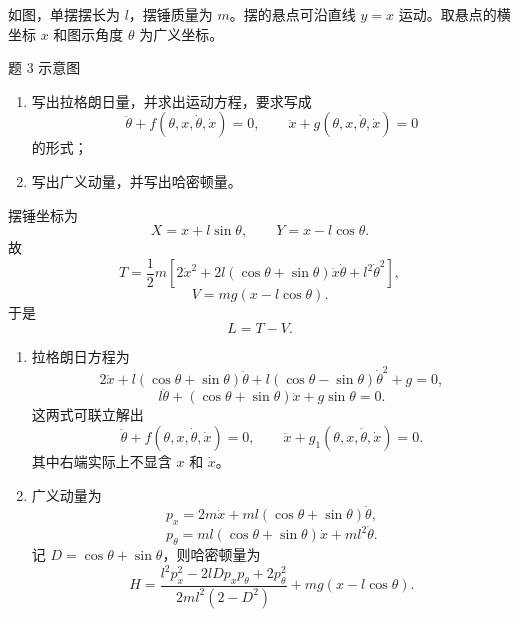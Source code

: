 \begin{question}[悬点受约束的单摆]
如图，单摆摆长为 $l$，摆锤质量为 $m$。摆的悬点可沿直线 $y=x$ 运动。取悬点的横坐标 $x$ 和图示角度 $\theta$ 为广义坐标。

\begin{center}

{\small 题 3 示意图}
\end{center}

\begin{enumerate}
  \item 写出拉格朗日量，并求出运动方程，要求写成
  \[
    \ddot\theta+f(\theta,x,\dot\theta,\dot x)=0,
    \qquad
    \ddot x+g(\theta,x,\dot\theta,\dot x)=0
  \]
  的形式；
  \item 写出广义动量，并写出哈密顿量。
\end{enumerate}

\begin{solution}
摆锤坐标为
\[
  X=x+l\sin\theta,
  \qquad
  Y=x-l\cos\theta .
\]
故
\[
  T=\frac12m\left[2\dot x^2+2l(\cos\theta+\sin\theta)\dot x\dot\theta
  +l^2\dot\theta^2\right],
\]
\[
  V=mg(x-l\cos\theta).
\]
于是
\[
  L=T-V.
\]
\begin{enumerate}
  \item 拉格朗日方程为
  \[
    2\ddot x+l(\cos\theta+\sin\theta)\ddot\theta
    +l(\cos\theta-\sin\theta)\dot\theta^2+g=0,
  \]
  \[
    l\ddot\theta+(\cos\theta+\sin\theta)\ddot x+g\sin\theta=0.
  \]
  这两式可联立解出
  \[
    \ddot\theta+f(\theta,x,\dot\theta,\dot x)=0,
    \qquad
    \ddot x+g_1(\theta,x,\dot\theta,\dot x)=0.
  \]
  其中右端实际上不显含 $x$ 和 $\dot x$。
  \item 广义动量为
  \[
    p_x=2m\dot x+ml(\cos\theta+\sin\theta)\dot\theta,
  \]
  \[
    p_\theta=ml(\cos\theta+\sin\theta)\dot x+ml^2\dot\theta .
  \]
  记 $D=\cos\theta+\sin\theta$，则哈密顿量为
  \[
    H=\frac{l^2p_x^2-2lDp_xp_\theta+2p_\theta^2}
    {2ml^2(2-D^2)}+mg(x-l\cos\theta).
  \]
\end{enumerate}



\end{solution}
\end{question}
